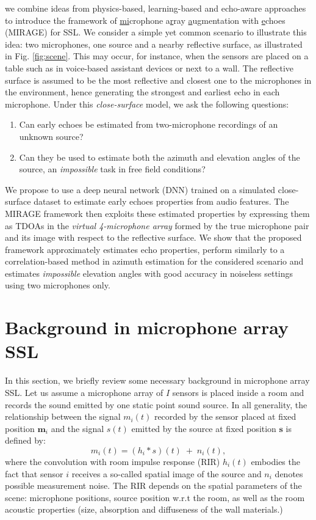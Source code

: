  we combine ideas from physics-based, learning-based and echo-aware approaches
to introduce the framework of \underline{mi}crophone a\underline{r}ray
\underline{a}u\underline{g}mentation with \underline{e}choes (MIRAGE) for SSL.
We consider a simple yet common scenario to illustrate this idea:
two microphones, one source and a nearby reflective surface, as illustrated in Fig. \cref{fig:scene}.
This may occur, for instance, when the sensors are placed on a table such as in
voice-based assistant devices or next to a wall.
The reflective surface is assumed to be the most reflective and closest one to the microphones in the environment,
hence generating the strongest and earliest echo in each microphone.
Under this \textit{close-surface} model, we ask the following questions:
\begin{enumerate}
\setlength\itemsep{-1mm}
\item Can early echoes be estimated from two-microphone recordings of an unknown source?
\item Can they be used to estimate both the azimuth and elevation angles of the source, an \textit{impossible} task in free field conditions?
\end{enumerate}
We propose to use a deep neural network (DNN) trained on a simulated close-surface dataset to estimate early echoes properties from audio features.
The MIRAGE framework then exploits these estimated properties by expressing them as TDOAs in the \textit{virtual 4-microphone array}
formed by the true microphone pair and its image with respect to the reflective surface.
We show that the proposed framework approximately estimates echo properties,
perform similarly to a correlation-based method in azimuth estimation for the considered
scenario and estimates \textit{impossible} elevation angles with good accuracy in noiseless settings using two microphones only.

\section{Background in microphone array SSL}\label{sec:background}
In this section, we briefly review some necessary background in microphone array SSL. Let us assume a microphone array of $I$ sensors is placed inside a room and records the sound emitted by one static point sound source. In all generality, the relationship between the signal $m_i(t)$ recorded by the sensor placed at fixed position $\mathbf{m}_i$ and the signal $s(t)$ emitted by the source at fixed position $\mathbf{s}$ is defined by:
\begin{equation}\label{eq:mirage:anymic_time}
m_i(t) = (h_i * s)(t)  \; + \; n_i(t),
\end{equation}
where the convolution with room impulse response (RIR) $h_i(t)$ embodies the fact that sensor $i$ receives a so-called spatial image of the source and $n_i$ denotes possible measurement noise. The RIR depends on the spatial parameters of the scene: microphone positions, source position w.r.t the room, as well as the room acoustic properties (size, absorption and diffuseness of the wall materials.)

